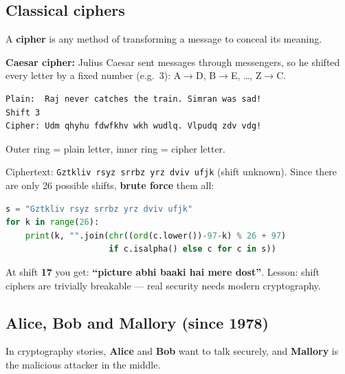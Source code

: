 \subsection{Classical ciphers}
A \textbf{cipher} is any method of transforming a message to conceal its meaning.

\textbf{Caesar cipher:} Julius Caesar sent messages through messengers, so he shifted every letter by a fixed number (e.g.\ 3): A$\to$D, B$\to$E, \ldots, Z$\to$C.
\begin{lstlisting}
Plain:  Raj never catches the train. Simran was sad!
Shift 3
Cipher: Udm qhyhu fdwfkhv wkh wudlq. Vlpudq zdv vdg!
\end{lstlisting}

\begin{center}
\end{center}
Outer ring = plain letter, inner ring = cipher letter.

\begin{workedex}
Ciphertext: \texttt{Gztkliv rsyz srrbz yrz dviv ufjk} (shift unknown). Since there are only 26 possible shifts, \textbf{brute force} them all:
\begin{lstlisting}[language=Python]
s = "Gztkliv rsyz srrbz yrz dviv ufjk"
for k in range(26):
    print(k, "".join(chr((ord(c.lower())-97-k) % 26 + 97)
                     if c.isalpha() else c for c in s))
\end{lstlisting}
At shift \textbf{17} you get: \textbf{``picture abhi baaki hai mere dost''}. Lesson: shift ciphers are trivially breakable --- real security needs modern cryptography.
\end{workedex}

\subsection{Alice, Bob and Mallory (since 1978)}
In cryptography stories, \textbf{Alice} and \textbf{Bob} want to talk securely, and \textbf{Mallory} is the malicious attacker in the middle.

